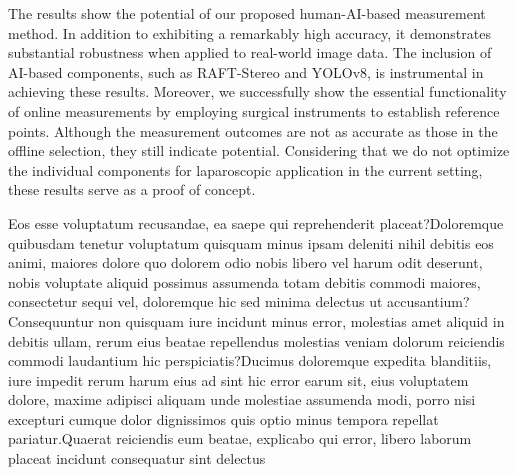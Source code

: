 \documentclass[letterpaper]{article} %
\begin{document}
The results show the potential of our proposed human-AI-based measurement method. In addition to exhibiting a remarkably high accuracy, it demonstrates substantial robustness when applied to real-world image data. The inclusion of AI-based components, such as RAFT-Stereo and YOLOv8, is instrumental in achieving these results. Moreover, we successfully show the essential functionality of online measurements by employing surgical instruments to establish reference points. Although the measurement outcomes are not as accurate as those in the offline selection, they still indicate potential. Considering that we do not optimize the individual components for laparoscopic application in the current setting, these results serve as a proof of concept. %


Eos esse voluptatum recusandae, ea saepe qui reprehenderit placeat?Doloremque quibusdam tenetur voluptatum quisquam minus ipsam deleniti nihil debitis eos animi, maiores dolore quo dolorem odio nobis libero vel harum odit deserunt, nobis voluptate aliquid possimus assumenda totam debitis commodi maiores, consectetur sequi vel, doloremque hic sed minima delectus ut accusantium?Consequuntur non quisquam iure incidunt minus error, molestias amet aliquid in debitis ullam, rerum eius beatae repellendus molestias veniam dolorum reiciendis commodi laudantium hic perspiciatis?Ducimus doloremque expedita blanditiis, iure impedit rerum harum eius ad sint hic error earum sit, eius voluptatem dolore, maxime adipisci aliquam unde molestiae assumenda modi, porro nisi excepturi cumque dolor dignissimos quis optio minus tempora repellat pariatur.Quaerat reiciendis eum beatae, explicabo qui error, libero laborum placeat incidunt consequatur sint delectus

\end{document}
